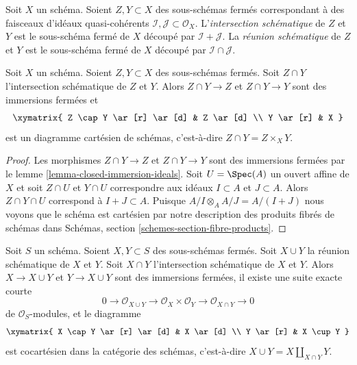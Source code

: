 \begin{definition}
\label{definition-scheme-theoretic-intersection-union}
Soit $X$ un schéma. Soient $Z, Y \subset X$ des sous-schémas fermés
correspondant à des faisceaux d'idéaux quasi-cohérents
$\mathcal{I}, \mathcal{J} \subset \mathcal{O}_X$. L'{\it intersection
schématique} de $Z$ et $Y$ est le
sous-schéma fermé de $X$ découpé par $\mathcal{I} + \mathcal{J}$. La {\it
réunion schématique} de $Z$
et $Y$ est le sous-schéma fermé de $X$
découpé par $\mathcal{I} \cap \mathcal{J}$.
\end{definition}

\begin{lemma}
\label{lemma-scheme-theoretic-intersection}
Soit $X$ un schéma. Soient $Z, Y \subset X$ des sous-schémas fermés.
Soit $Z \cap Y$ l'intersection schématique de $Z$ et $Y$.
Alors $Z \cap Y \to Z$ et $Z \cap Y \to Y$ sont des immersions fermées
et
$$
\xymatrix{
Z \cap Y \ar[r] \ar[d] & Z \ar[d] \\
Y \ar[r] & X
}
$$
est un diagramme cartésien de schémas, c'est-à-dire $Z \cap Y = Z \times_X Y$.
\end{lemma}

\begin{proof}
Les morphismes $Z \cap Y \to Z$ et $Z \cap Y \to Y$ sont des immersions fermées
par le lemme \ref{lemma-closed-immersion-ideals}. Soit $U = \Spec(A)$
un ouvert affine de $X$ et soit $Z \cap U$ et $Y \cap U$
correspondre aux idéaux $I \subset A$ et $J \subset A$.
Alors $Z \cap Y \cap U$ correspond à $I + J \subset A$. Puisque
$A/I \otimes_A A/J = A/(I + J)$ nous voyons que le schéma est cartésien
par notre description des produits fibrés
de schémas dans Schémas, section \ref{schemes-section-fibre-products}.
\end{proof}

\begin{lemma}
\label{lemma-scheme-theoretic-union}
Soit $S$ un schéma. Soient $X, Y \subset S$ des sous-schémas fermés.
Soit $X \cup Y$ la réunion schématique de $X$ et $Y$.
Soit $X \cap Y$ l'intersection schématique de $X$ et $Y$.
Alors $X \to X \cup Y$ et $Y \to X \cup Y$ sont des immersions fermées, il existe une
suite exacte courte
$$
0 \to \mathcal{O}_{X \cup Y} \to \mathcal{O}_X \times \mathcal{O}_Y
\to \mathcal{O}_{X \cap Y} \to 0
$$
de $\mathcal{O}_S$-modules, et le diagramme
$$
\xymatrix{
X \cap Y \ar[r] \ar[d] & X \ar[d] \\
Y \ar[r] & X \cup Y
}
$$
est cocartésien dans la catégorie des schémas,
c'est-à-dire $X \cup Y = X \amalg_{X \cap Y} Y$.
\end{lemma}

